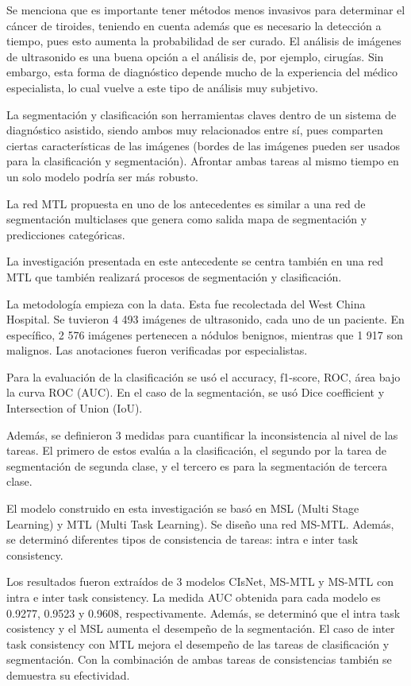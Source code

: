 Se menciona que es importante tener métodos menos invasivos para determinar el cáncer de tiroides, teniendo en cuenta además que es necesario la detección a tiempo, pues esto aumenta la probabilidad de ser curado. El análisis de imágenes de ultrasonido es una buena opción a el análisis de, por ejemplo, cirugías. Sin embargo, esta forma de diagnóstico depende mucho de la experiencia del médico especialista, lo cual vuelve a este tipo de análisis muy subjetivo.

La segmentación y clasificación son herramientas claves dentro de un sistema de diagnóstico asistido, siendo ambos muy relacionados entre sí, pues comparten ciertas características de las imágenes (bordes de las imágenes pueden ser usados para la clasificación y segmentación). Afrontar ambas tareas al mismo tiempo en un solo modelo podría ser más robusto.

La red MTL propuesta en uno de los antecedentes es similar a una red de segmentación multiclases que genera como salida mapa de segmentación y predicciones categóricas.

La investigación presentada en este antecedente se centra también en una red MTL que también realizará procesos de segmentación y clasificación.

La metodología empieza con la data. Esta fue recolectada del West China Hospital. Se tuvieron 4 493 imágenes de ultrasonido, cada uno de un paciente. En específico, 2 576 imágenes pertenecen a nódulos benignos, mientras que 1 917 son malignos. Las anotaciones fueron verificadas por especialistas.

Para la evaluación de la clasificación se usó el accuracy, f1-score, ROC, área bajo la curva ROC (AUC). En el caso de la segmentación, se usó Dice coefficient y Intersection of Union (IoU).

Además, se definieron 3 medidas para cuantificar la inconsistencia al nivel de las tareas. El primero de estos evalúa a la clasificación, el segundo por la tarea de segmentación de segunda clase, y el tercero es para la segmentación de tercera clase.

El modelo construido en esta investigación se basó en MSL (Multi Stage Learning) y MTL (Multi Task Learning). Se diseño una red MS-MTL. Además, se determinó diferentes tipos de consistencia de tareas: intra e inter task consistency.

Los resultados fueron extraídos de 3 modelos CIsNet, MS-MTL y MS-MTL con intra e inter task consistency. La medida AUC obtenida para cada modelo es 0.9277, 0.9523 y 0.9608, respectivamente. Además, se determinó que el intra task cosistency y el MSL aumenta el desempeño de la segmentación. El caso de inter task consistency con MTL mejora el desempeño de las tareas de clasificación y segmentación. Con la combinación de ambas tareas de consistencias también se demuestra su efectividad.

